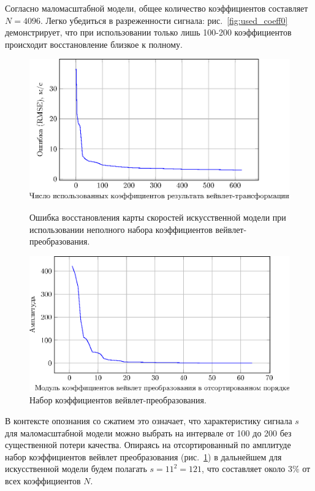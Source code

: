 \documentclass[14pt]{matmex-diploma-custom}
\begin{document}
Согласно маломасштабной модели, общее количество коэффициентов составляет $N = 4096$.  Легко убедиться в разреженности сигнала: рис.~\ref{fig:used_coeff0} демонстрирует, что при использовании только лишь 100-200 коэффициентов происходит восстановление близкое к полному. \\

\begin{figure}[tbp]
  \centering
  \begin{minipage}[b]{0.8\textwidth}
    \includegraphics[width=\textwidth]{pics_eps/rmse_coef_in_use_reconstr.eps}
    \caption{\small Ошибка восстановления карты скоростей искусственной модели при использовании неполного набора коэффициентов вейвлет-преобразования.}
    \label{fig:used_coeff0}
  \end{minipage}
  \hfill
  \begin{minipage}[b]{0.8\textwidth}
    \includegraphics[width=\textwidth]{pics_eps/line_coefs_sparse_reconstr.eps}
    \caption{\small Набор коэффициентов вейвлет-преобразования.}
    \label{fig:used_coeff}
  \end{minipage}
\end{figure}

В контексте опознания со сжатием это означает, что характеристику сигнала $s$ для маломасштабной модели можно выбрать на интервале от 100 до 200 без существенной потери качества. Опираясь на отсортированный по амплитуде набор коэффициентов вейвлет преобразования (рис.~\ref{fig:used_coeff}) в дальнейшем для искусственной модели будем полагать $s=11^2 = 121 $, что составляет около $3\%$ от всех коэффициентов $N$.\\
\end{document}
